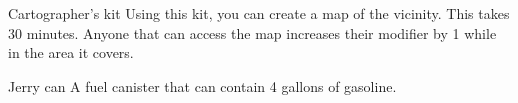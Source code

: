 \begin{describe}{Cartographer's kit}
  Using this kit, you can create a map of the vicinity. This takes 30 minutes. Anyone that can access the map increases their  modifier by 1 while in the area it covers.
\end{describe}

\begin{describe}{Jerry can}
  A fuel canister that can contain 4 gallons of gasoline.
\end{describe}
